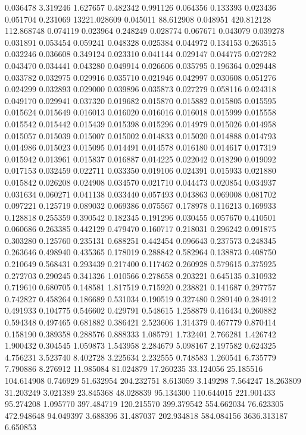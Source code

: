 0.036478
3.319246
1.627657
0.482342
0.991126
0.064356
0.133393
0.023436
0.051704
0.231069
13221.028609
0.045011
88.612908
0.048951
420.812128
112.868748
0.074119
0.023964
0.248249
0.028774
0.067671
0.043079
0.039278
0.031891
0.053454
0.059241
0.048328
0.025384
0.044972
0.134153
0.263515
0.032246
0.036608
0.349124
0.023310
0.041144
0.029147
0.044775
0.027282
0.043470
0.034441
0.043280
0.049914
0.026606
0.035795
0.196364
0.029448
0.033782
0.032975
0.029916
0.035710
0.021946
0.042997
0.030608
0.051276
0.024299
0.032893
0.029000
0.039896
0.035873
0.027279
0.058116
0.024318
0.049170
0.029941
0.037320
0.019682
0.015870
0.015882
0.015805
0.015595
0.015624
0.015649
0.016013
0.016020
0.016016
0.016018
0.015999
0.015558
0.015542
0.015442
0.015439
0.015398
0.015296
0.014979
0.015026
0.014958
0.015057
0.015039
0.015007
0.015002
0.014833
0.015020
0.014888
0.014793
0.014986
0.015023
0.015095
0.014491
0.014578
0.016180
0.014617
0.017319
0.015942
0.013961
0.015837
0.016887
0.014225
0.022042
0.018290
0.019092
0.017153
0.032459
0.022711
0.033350
0.019106
0.024391
0.015933
0.021880
0.015842
0.026208
0.024908
0.034570
0.021710
0.044473
0.020854
0.034937
0.031634
0.060271
0.041138
0.033440
0.057493
0.043863
0.069008
0.081702
0.097221
0.125719
0.089032
0.069386
0.075567
0.178978
0.116213
0.169933
0.128818
0.255359
0.390542
0.182345
0.191296
0.030455
0.057670
0.410501
0.060686
0.263385
0.442129
0.479470
0.160717
0.218031
0.296242
0.091875
0.303280
0.125760
0.235131
0.688251
0.442454
0.096643
0.237573
0.248345
0.263646
0.498940
0.435365
0.178019
0.288842
0.582964
0.138873
0.408750
0.210649
0.568431
0.293439
0.217400
0.117462
0.260928
0.579615
0.375925
0.272703
0.290245
0.341326
1.010566
0.278658
0.203221
0.645135
0.310932
0.719610
0.680705
0.148581
1.817519
0.715920
0.238821
0.141687
0.297757
0.742827
0.458264
0.186689
0.531034
0.190519
0.327480
0.289140
0.284912
0.491933
0.104775
0.546602
0.429791
0.548615
1.258879
0.416434
0.260882
0.594348
0.497465
0.681882
0.386421
2.523606
1.314379
0.467779
0.870414
0.158190
0.389358
0.288576
0.888333
1.085791
1.732401
2.766281
1.426742
1.900432
0.304545
1.059873
1.543958
2.284679
5.098167
2.197582
0.624325
4.756231
3.523740
8.402728
3.225634
2.232555
0.748583
1.260541
6.735779
7.790886
8.276912
11.985084
81.024879
17.260235
33.124056
25.185516
104.614908
0.746929
51.632954
204.232751
8.613059
3.149298
7.564247
18.263809
31.203249
3.021389
23.845368
48.028839
95.134300
110.644015
221.901433
95.274208
1.095770
397.484719
120.215570
399.379542
554.662034
76.623305
472.948648
94.049397
3.688396
31.487037
202.934818
584.084156
3636.313187
6.650853
